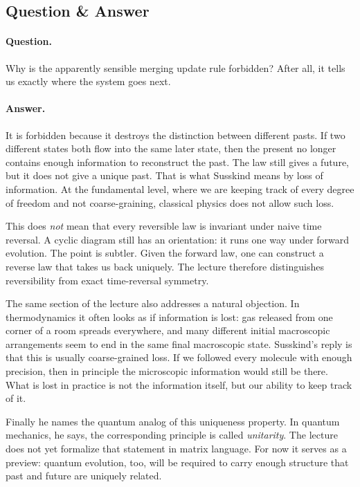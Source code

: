 \subsection{Question \& Answer}

\paragraph{Question.} Why is the apparently sensible merging update rule forbidden? After all, it tells us exactly where the system goes next.

\paragraph{Answer.} It is forbidden because it destroys the distinction between different pasts. If two different states both flow into the same later state, then the present no longer contains enough information to reconstruct the past. The law still gives a future, but it does not give a unique past. That is what Susskind means by loss of information. At the fundamental level, where we are keeping track of every degree of freedom and not coarse-graining, classical physics does not allow such loss.

This does \emph{not} mean that every reversible law is invariant under naive time reversal. A cyclic diagram still has an orientation: it runs one way under forward evolution. The point is subtler. Given the forward law, one can construct a reverse law that takes us back uniquely. The lecture therefore distinguishes reversibility from exact time-reversal symmetry.

The same section of the lecture also addresses a natural objection. In thermodynamics it often looks as if information is lost: gas released from one corner of a room spreads everywhere, and many different initial macroscopic arrangements seem to end in the same final macroscopic state. Susskind's reply is that this is usually coarse-grained loss. If we followed every molecule with enough precision, then in principle the microscopic information would still be there. What is lost in practice is not the information itself, but our ability to keep track of it.

Finally he names the quantum analog of this uniqueness property. In quantum mechanics, he says, the corresponding principle is called \emph{unitarity}. The lecture does not yet formalize that statement in matrix language. For now it serves as a preview: quantum evolution, too, will be required to carry enough structure that past and future are uniquely related.

